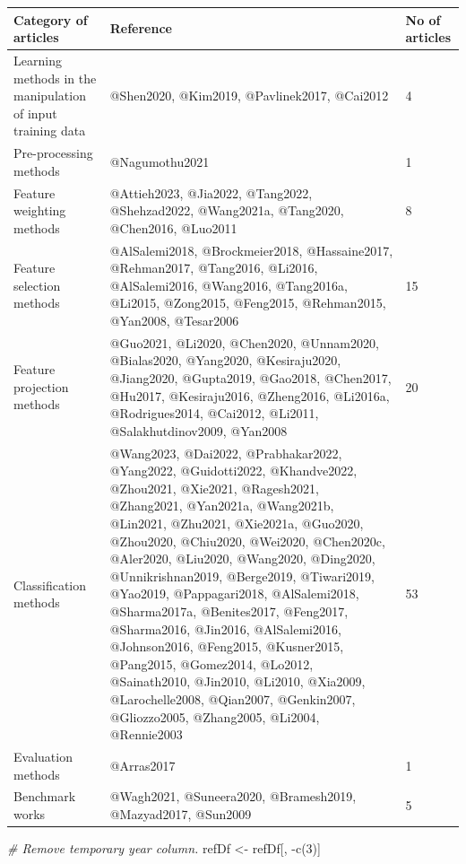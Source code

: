\documentclass[
]{article}
\newenvironment{Shaded}{\begin{snugshade}}{\end{snugshade}}
\newcommand{\CommentTok}[1]{\textcolor[rgb]{0.56,0.35,0.01}{\textit{#1}}}
\newcommand{\DecValTok}[1]{\textcolor[rgb]{0.00,0.00,0.81}{#1}}
\newcommand{\FunctionTok}[1]{\textcolor[rgb]{0.00,0.00,0.00}{#1}}
\newcommand{\NormalTok}[1]{#1}
\newcommand{\OtherTok}[1]{\textcolor[rgb]{0.56,0.35,0.01}{#1}}
\newcommand{\SpecialCharTok}[1]{\textcolor[rgb]{0.00,0.00,0.00}{#1}}
\begin{document}
\begin{tabular}{l|l|l}
\hline
Category of articles & Reference & No of articles\\
\hline
Learning methods in the manipulation of input training data & @Shen2020, @Kim2019, @Pavlinek2017, @Cai2012 & 4\\
\hline
Pre-processing methods & @Nagumothu2021 & 1\\
\hline
Feature weighting methods & @Attieh2023, @Jia2022, @Tang2022, @Shehzad2022, @Wang2021a, @Tang2020, @Chen2016, @Luo2011 & 8\\
\hline
Feature selection methods & @AlSalemi2018, @Brockmeier2018, @Hassaine2017, @Rehman2017, @Tang2016, @Li2016, @AlSalemi2016, @Wang2016, @Tang2016a, @Li2015, @Zong2015, @Feng2015, @Rehman2015, @Yan2008, @Tesar2006 & 15\\
\hline
Feature projection methods & @Guo2021, @Li2020, @Chen2020, @Unnam2020, @Bialas2020, @Yang2020, @Kesiraju2020, @Jiang2020, @Gupta2019, @Gao2018, @Chen2017, @Hu2017, @Kesiraju2016, @Zheng2016, @Li2016a, @Rodrigues2014, @Cai2012, @Li2011, @Salakhutdinov2009, @Yan2008 & 20\\
\hline
Classification methods & @Wang2023, @Dai2022, @Prabhakar2022, @Yang2022, @Guidotti2022, @Khandve2022, @Zhou2021, @Xie2021, @Ragesh2021, @Zhang2021, @Yan2021a, @Wang2021b, @Lin2021, @Zhu2021, @Xie2021a, @Guo2020, @Zhou2020, @Chiu2020, @Wei2020, @Chen2020c, @Aler2020, @Liu2020, @Wang2020, @Ding2020, @Unnikrishnan2019, @Berge2019, @Tiwari2019, @Yao2019, @Pappagari2018, @AlSalemi2018, @Sharma2017a, @Benites2017, @Feng2017, @Sharma2016, @Jin2016, @AlSalemi2016, @Johnson2016, @Feng2015, @Kusner2015, @Pang2015, @Gomez2014, @Lo2012, @Sainath2010, @Jin2010, @Li2010, @Xia2009, @Larochelle2008, @Qian2007, @Genkin2007, @Gliozzo2005, @Zhang2005, @Li2004, @Rennie2003 & 53\\
\hline
Evaluation methods & @Arras2017 & 1\\
\hline
Benchmark works & @Wagh2021, @Suneera2020, @Bramesh2019, @Mazyad2017, @Sun2009 & 5\\
\hline
\end{tabular}

\begin{Shaded}
\begin{Highlighting}[]
\CommentTok{\# Remove temporary year column.}
\NormalTok{refDf }\OtherTok{\textless{}{-}}\NormalTok{ refDf[, }\SpecialCharTok{{-}}\FunctionTok{c}\NormalTok{(}\DecValTok{3}\NormalTok{)]}
\end{Highlighting}
\end{Shaded}
\end{document}
